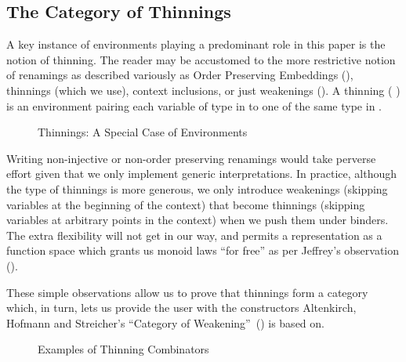 \subsection{The Category of Thinnings}
\label{sec:categoryrenamings}

A key instance of environments playing a predominant role in this paper is the
notion of thinning. The reader may be accustomed to the more restrictive notion
of renamings as described variously as Order Preserving Embeddings
(\cite{chapman2009type}), thinnings (which we use), context inclusions,
or just weakenings (\cite{altenkirch1995categorical}). A thinning
(  ) is an environment pairing each variable
of type  in  to one of the same type in .

\begin{figure}[h]
\caption{Thinnings: A Special Case of Environments\label{fig:thinnings}}
\end{figure}

Writing non-injective or non-order preserving renamings would take
perverse effort given that we only implement generic interpretations.
In practice, although the type of thinnings is more generous, we
only introduce weakenings (skipping variables at the beginning of
the context) that become thinnings (skipping variables at arbitrary
points in the context) when we push them under binders. The extra
flexibility will not get in our way, and permits a representation
as a function space which grants us monoid laws ``for free'' as
per Jeffrey's observation (\citeyear{jeffrey2011assoc}).

These simple observations allow us to prove that thinnings form a
category which, in turn, lets us provide the user with the constructors
Altenkirch, Hofmann and Streicher's ``Category of
Weakening''~(\citeyear{altenkirch1995categorical}) is based on.

\begin{figure}[h]
\begin{minipage}{0.5\textwidth}
\end{minipage}\begin{minipage}{0.5\textwidth}
\end{minipage}

\caption{Examples of Thinning Combinators\label{fig:extendth}}
\end{figure}

